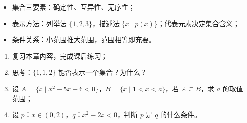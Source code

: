 \begin{board}
\begin{itemize}
  \item 集合三要素：确定性、互异性、无序性；
  \item 表示方法：列举法 $\{1,2,3\}$，描述法 $\{x\mid p(x)\}$；代表元素决定集合含义；
  \item 条件关系：小范围推大范围，范围相等即充要。
\end{itemize}
\end{board}

\begin{homework}
\begin{enumerate}
  \item 复习本章内容，完成课后练习；
  \item 思考：$\{1,1,2\}$ 能否表示一个集合？为什么？
  \item 设 $A=\{x\mid x^2-5x+6<0\}$，$B=\{x\mid 1<x<a\}$，若 $A\subseteq B$，求 $a$ 的取值范围；
  \item 设 $p$：$x\in(0,2)$，$q$：$x^2-2x<0$，判断 $p$ 是 $q$ 的什么条件。
\end{enumerate}
\end{homework}
